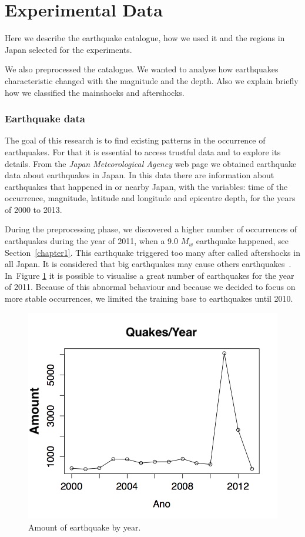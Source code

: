 \section{Experimental Data}
Here we describe the earthquake catalogue, how we used it and the regions in Japan selected for the experiments.

We also preprocessed the catalogue. We wanted to analyse how earthquakes characteristic changed with the magnitude and the depth. Also we explain briefly how we classified the mainshocks and aftershocks.

\subsubsection{Earthquake data}
The goal of this research is to find existing patterns in the occurrence of earthquakes. For that it is essential to access trustful data and to explore its details. From the  {\it Japan Meteorological Agency} web page we obtained earthquake data about earthquakes in Japan. In this data there are information about earthquakes that happened in or nearby Japan,  with the variables: time of the occurrence, magnitude, latitude and longitude and epicentre depth, for the years of 2000 to 2013.

During the preprocessing phase, we discovered a higher number of occurrences of earthquakes during the year of 2011, when a 9.0 $M_w$ earthquake happened, see Section~\ref{chapter1}. This earthquake triggered too many after called aftershocks in all Japan. It is considered that big earthquakes may cause others earthquakes~\cite{zhuang2004analyzing}. In~Figure \ref{ocorrenciasAno} it is possible to visualise a great number of earthquakes for the year of 2011. Because of this abnormal behaviour and because we decided to focus on more stable occurrences, we limited the training base to earthquakes until 2010.

\begin{figure}[]
\centering
\includegraphics[scale=0.5]{img/ocorrenciasAno.png}
\caption{Amount of earthquake by year.}
\label{ocorrenciasAno}
\end{figure}

